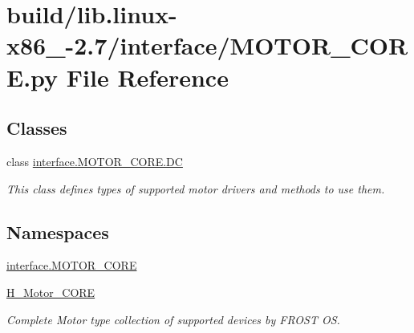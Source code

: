 \hypertarget{build_2lib_8linux-x86__64-2_87_2interface_2MOTOR__CORE_8py}{}\section{build/lib.linux-\/x86\+\_-\/2.7/interface/\+M\+O\+T\+O\+R\+\_\+\+C\+O\+R\+E.py File Reference}
\label{build_2lib_8linux-x86__64-2_87_2interface_2MOTOR__CORE_8py}
\subsection*{Classes}
\begin{DoxyCompactItemize}
\item 
class \hyperlink{classinterface_1_1MOTOR__CORE_1_1DC}{interface.\+M\+O\+T\+O\+R\+\_\+\+C\+O\+R\+E.\+D\+C}
\begin{DoxyCompactList}\small\item\em This class defines types of supported motor drivers and methods to use them. \end{DoxyCompactList}\end{DoxyCompactItemize}
\subsection*{Namespaces}
\begin{DoxyCompactItemize}
\item 
 \hyperlink{namespaceinterface_1_1MOTOR__CORE}{interface.\+M\+O\+T\+O\+R\+\_\+\+C\+O\+R\+E}
\item 
 \hyperlink{namespaceH__Motor__CORE}{H\+\_\+\+Motor\+\_\+\+C\+O\+R\+E}
\begin{DoxyCompactList}\small\item\em Complete Motor type collection of supported devices by F\+R\+O\+S\+T O\+S. \end{DoxyCompactList}\end{DoxyCompactItemize}

